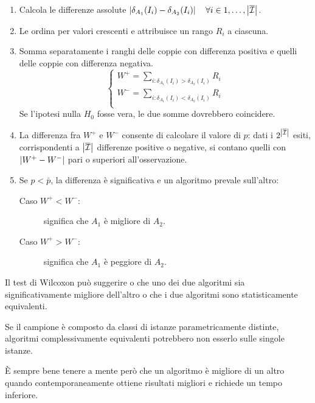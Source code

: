 \documentclass[\main/main.tex]{subfiles}
\begin{document}
\begin{observation}
    \begin{enumerate}
        \item Calcola le differenze assolute \(\left\lvert\delta_{A_1}(I_i) - \delta_{A_2}(I_i)\right\rvert \quad \forall i \in 1, \ldots, \left\lvert\overline{\mathcal{I}}\right\rvert\).
        \item Le ordina per valori crescenti e attribuisce un rango \(R_i\) a ciascuna.
        \item Somma separatamente i ranghi delle coppie con differenza positiva e quelli delle coppie con differenza negativa.
        \[
            \begin{cases}
                W^+ = \sum_{i: \delta_{A_1}(I_i)>\delta_{A_2}(I_i)} R_i\\
                W^- = \sum_{i: \delta_{A_1}(I_i)<\delta_{A_2}(I_i)} R_i\\
            \end{cases}
        \]
        Se l'ipotesi nulla \(H_0\) fosse vera, le due somme dovrebbero coincidere.
        \item La differenza fra \(W^+\) e \(W^-\) consente di calcolare il valore di \(p\): dati i \(2^{\left\lvert\overline{\mathcal{I}}\right\rvert}\) esiti, corrispondenti a \(\left\lvert\overline{\mathcal{I}}\right\rvert\) differenze positive o negative, si contano quelli con \(\left\lvert W^+ - W^-\right\rvert\) pari o superiori all'osservazione.
        \item Se \(p < \bar{p}\), la differenza è significativa e un algoritmo prevale sull'altro:
        \begin{description}
            \item[Caso \(W^+ < W^-\):] significa che \(A_1\) è migliore di \(A_2\).
            \item[Caso \(W^+ > W^-\):] significa che \(A_1\) è peggiore di \(A_2\).
        \end{description}
    \end{enumerate}
\end{observation}
\begin{observation}
    Il test di Wilcoxon può suggerire o che uno dei due algoritmi sia significativamente migliore dell'altro o che i due algoritmi sono statisticamente equivalenti.
    
    Se il campione è composto da classi di istanze parametricamente distinte, algoritmi complessivamente equivalenti potrebbero non esserlo sulle singole istanze.
    
    È sempre bene tenere a mente però che un algoritmo è migliore di un altro quando contemporaneamente ottiene risultati migliori e richiede un tempo inferiore.
\end{observation}
\clearpage
\end{document}
